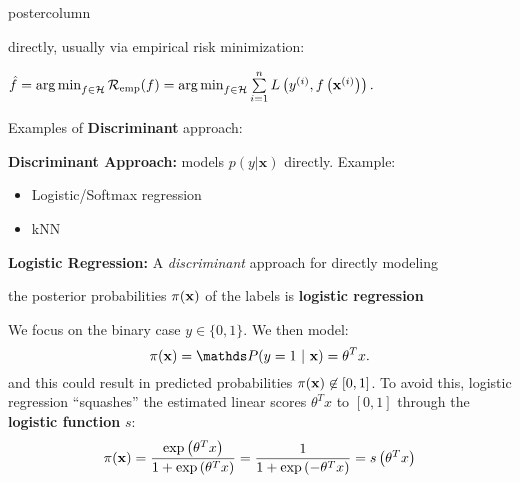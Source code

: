 \documentclass{beamer}
\begin{document}
\begin{frame}[fragile]{}
\begin{columns}
	
	\begin{column}{.31\textwidth}
	\begin{beamercolorbox}[center]{postercolumn}
	
	\begin{minipage}{.98\textwidth}
  \parbox[t][\columnheight]{\textwidth}{
  \begin{myblock}{}
    
  \begin{codebox}
  directly, usually via empirical risk minimization:
  \end{codebox}
    
  \hspace*{1ex}$ \hat{f} = \mathop{\mathrm{arg\,min}}_{f \in \mathcal{H}} \mathcal{R}_{\text{emp}}(f) = \mathop{\mathrm{arg\,min}}_{f \in \mathcal{H}} \sum\limits_{i=1}^n L\left(y^{(i)}, f\left(\mathbf{x}^{(i)}\right)\right).$
    
    \begin{codebox}
  Examples of \textbf{Discriminant} approach:
    \end{codebox}
     \hspace*{1ex}\textbf{Discriminant Approach: }models $p(y|\bm{x})$ directly. Example: 
     
  \begin{itemize}[$\bullet$]     \setlength{\itemindent}{+.3in}
      \item Logistic/Softmax regression
      \item kNN
  \end{itemize}
  
  \vspace*{1ex}
  
  \begin{codebox}
  \textbf{Logistic Regression: }A \emph{discriminant} approach for directly modeling
  \end{codebox}
  
  \begin{codebox}
  the posterior probabilities $\pi(\mathbf{x})$ of the labels is \textbf{logistic regression}
  \end{codebox}
  
  \hspace*{1ex}We focus on the binary case $y \in \{0, 1\}$. We then model: \[ \pix = \post = \theta^T x .\] 
  \hspace*{1ex}and this could result in predicted probabilities $\pi(\mathbf{x}) \not\in [0,1]$. To avoid \hspace*{1ex}this, logistic regression \enquote{squashes} the estimated linear scores $\theta^T x$ to \hspace*{1ex}$[0,1]$ through the \textbf{logistic function} $s$:
  \vspace*{1ex}
    \[ \pi(\mathbf{x}) = \frac{\exp\left(\theta^Tx\right)}{1+\exp\left(\theta^Tx\right)} = \frac{1}{1+\exp\left(-\theta^Tx\right)} = s\left(\theta^T x\right) \]
    

\end{myblock}}
\end{minipage}
\end{beamercolorbox}
\end{column}
\end{columns}
\end{frame}
\end{document}

